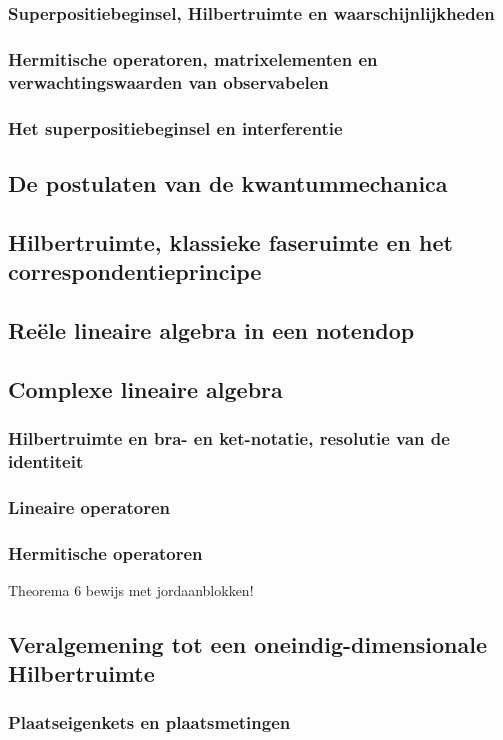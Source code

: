 \documentclass[a4paper,twoside]{article}
\theoremstyle{definition}
\theoremstyle{plain}
\begin{document}
\subsubsection{Superpositiebeginsel, Hilbertruimte en waarschijnlijkheden}
\subsubsection{Hermitische operatoren, matrixelementen en verwachtingswaarden van observabelen}
\subsubsection{Het superpositiebeginsel en interferentie}
\subsection{De postulaten van de kwantummechanica}
\subsection{Hilbertruimte, klassieke faseruimte en het correspondentieprincipe}
\subsection{Reële lineaire algebra in een notendop}
\subsection{Complexe lineaire algebra}
\subsubsection{Hilbertruimte en bra- en ket-notatie, resolutie van de identiteit}
\subsubsection{Lineaire operatoren}
\subsubsection{Hermitische operatoren}
Theorema 6 bewijs met jordaanblokken!
\subsection{Veralgemening tot een oneindig-dimensionale Hilbertruimte}
\subsubsection{Plaatseigenkets en plaatsmetingen}
\end{document}
